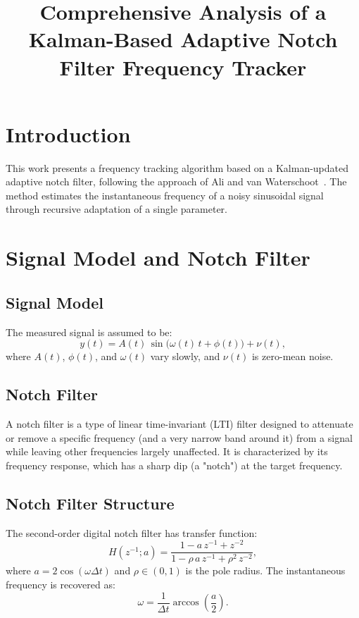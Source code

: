 \documentclass[12pt,letterpaper]{article}
\title{Comprehensive Analysis of a Kalman-Based Adaptive Notch Filter Frequency Tracker}
\author{}
\date{}
\begin{document}
\maketitle

\section{Introduction}
This work presents a frequency tracking algorithm based on a Kalman-updated adaptive notch filter, following the approach of Ali and van Waterschoot~\cite{AliWaterschoot2023}. The method estimates the instantaneous frequency of a noisy sinusoidal signal through recursive adaptation of a single parameter.

\section{Signal Model and Notch Filter}
\subsection{Signal Model}
The measured signal is assumed to be:
\begin{equation}
y(t) = A(t)\,\sin\bigl(\omega(t)\,t + \phi(t)\bigr) + \nu(t),
\label{eq:signal_model}
\end{equation}
where $A(t)$, $\phi(t)$, and $\omega(t)$ vary slowly, and $\nu(t)$ is zero-mean noise.

\subsection{Notch Filter}
A notch filter is a type of linear time-invariant (LTI) filter designed to attenuate or remove a specific frequency (and a very narrow band around it) from a signal while leaving other frequencies largely unaffected. It is characterized by its frequency response, which has a sharp dip (a "notch") at the target frequency.

\subsection{Notch Filter Structure}
The second-order digital notch filter has transfer function:
\begin{equation}
H(z^{-1};a) = \frac{1 - a\,z^{-1} + z^{-2}}{1 - \rho\,a\,z^{-1} + \rho^2\,z^{-2}},
\label{eq:notch_tf}
\end{equation}
where $a = 2\cos(\omega \Delta t)$ and $\rho \in (0,1)$ is the pole radius. The instantaneous frequency is recovered as:
\begin{equation}
\omega = \frac{1}{\Delta t}\arccos\!\left(\frac{a}{2}\right).
\label{eq:freq_estimate}
\end{equation}
\end{document}
